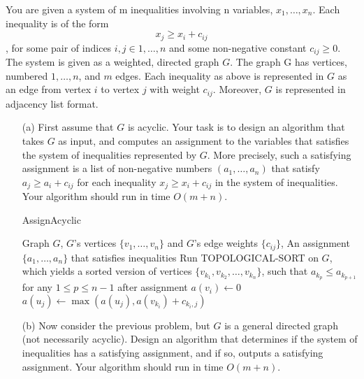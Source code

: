 \noindent {} 
You are given a system of m inequalities involving n variables, $x_1, \dots, x_n$. Each inequality is of the form
$$x_j \ge x_i + c_{ij}$$
, for some pair of indices $i, j \in {1, \dots, n}$ and some non-negative constant $c_{ij} \ge 0$.\\
The system is given as a weighted, directed graph $G$. The graph G has vertices, numbered $1, \dots , n$, and $m$ edges. Each inequality as above is represented in $G$ as an edge from vertex $i$ to vertex $j$ with weight
$c_{ij}$. Moreover, $G$ is represented in adjacency list format.
\begin{itemize}
    \item[(a)] First assume that $G$ is acyclic. Your task is to design an algorithm that takes $G$ as input, and computes an assignment to the variables that satisfies the system of inequalities represented by $G$. More precisely, such a satisfying assignment is a list of non-negative numbers $(a_1, \dots, a_n)$ that satisfy $a_j \ge a_i + c_{ij}$ for each inequality $x_j \ge x_i + c_{ij}$ in the system of inequalities. Your algorithm should run in time $O(m + n)$. \\
    \begin{algorithm}[!h]
    \caption{AssignAcyclic} \label{alg:assign-acyclic}
    \begin{algorithmic}[1]
        \Require Graph $G$, $G$'s vertices $\{v_1, \dots, v_n\}$ and $G$'s edge weights $\{c_{ij}\}$,
        \Ensure An assignment $\{a_1, \dots, a_n\}$ that satisfies inequalities
        \State Run TOPOLOGICAL-SORT on $G$, which yields a sorted version of vertices $\{v_{k_1}, v_{k_2}, \dots, v_{k_n}\}$, such that $a_{k_p} \le a_{k_{p+1}}$ for any $1 \le p \le n-1$ after assignment
         
            \State $a(v_i) \leftarrow 0$
        \EndFor
         
             
                \State $a(u_j) \leftarrow \max(a(u_j), a(v_{k_i}) + c_{k_i, j})$
            \EndFor
        \EndFor
    \end{algorithmic}
    \end{algorithm}
    \item[(b)] Now consider the previous problem, but $G$ is a general directed graph (not necessarily acyclic). Design an algorithm that determines if the system of inequalities has a satisfying assignment, and if so, outputs a satisfying assignment. Your algorithm should run in time $O(m + n)$. \\

\end{itemize}
